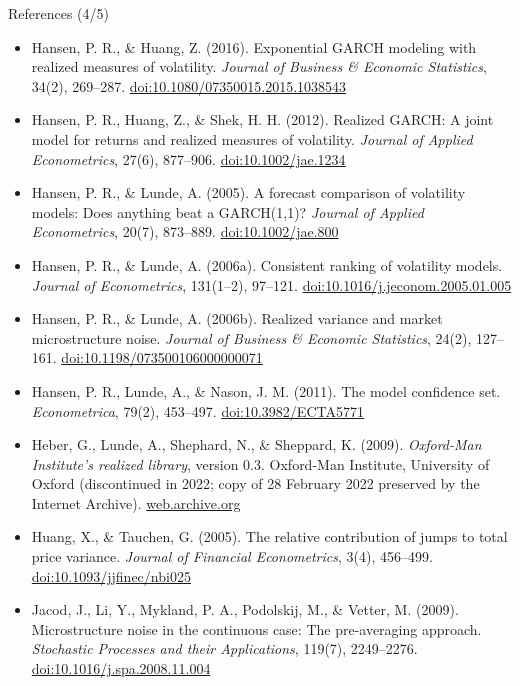 \begin{frame}{References (4/5)}
\itemsize{\tiny}
\begin{itemize}
    \item Hansen, P. R., \& Huang, Z. (2016). Exponential GARCH modeling with realized measures of volatility. \textit{Journal of Business \& Economic Statistics}, 34(2), 269--287. \href{https://doi.org/10.1080/07350015.2015.1038543}{doi:10.1080/07350015.2015.1038543}
    \item Hansen, P. R., Huang, Z., \& Shek, H. H. (2012). Realized GARCH: A joint model for returns and realized measures of volatility. \textit{Journal of Applied Econometrics}, 27(6), 877--906. \href{https://doi.org/10.1002/jae.1234}{doi:10.1002/jae.1234}
    \item Hansen, P. R., \& Lunde, A. (2005). A forecast comparison of volatility models: Does anything beat a GARCH(1,1)? \textit{Journal of Applied Econometrics}, 20(7), 873--889. \href{https://doi.org/10.1002/jae.800}{doi:10.1002/jae.800}
    \item Hansen, P. R., \& Lunde, A. (2006a). Consistent ranking of volatility models. \textit{Journal of Econometrics}, 131(1--2), 97--121. \href{https://doi.org/10.1016/j.jeconom.2005.01.005}{doi:10.1016/j.jeconom.2005.01.005}
    \item Hansen, P. R., \& Lunde, A. (2006b). Realized variance and market microstructure noise. \textit{Journal of Business \& Economic Statistics}, 24(2), 127--161. \href{https://doi.org/10.1198/073500106000000071}{doi:10.1198/073500106000000071}
    \item Hansen, P. R., Lunde, A., \& Nason, J. M. (2011). The model confidence set. \textit{Econometrica}, 79(2), 453--497. \href{https://doi.org/10.3982/ECTA5771}{doi:10.3982/ECTA5771}
    \item Heber, G., Lunde, A., Shephard, N., \& Sheppard, K. (2009). \textit{Oxford-Man Institute's realized library}, version 0.3. Oxford-Man Institute, University of Oxford (discontinued in 2022; copy of 28 February 2022 preserved by the Internet Archive). \href{https://web.archive.org/web/2021/https://realized.oxford-man.ox.ac.uk/terms-and-conditions}{web.archive.org}
    \item Huang, X., \& Tauchen, G. (2005). The relative contribution of jumps to total price variance. \textit{Journal of Financial Econometrics}, 3(4), 456--499. \href{https://doi.org/10.1093/jjfinec/nbi025}{doi:10.1093/jjfinec/nbi025}
    \item Jacod, J., Li, Y., Mykland, P. A., Podolskij, M., \& Vetter, M. (2009). Microstructure noise in the continuous case: The pre-averaging approach. \textit{Stochastic Processes and their Applications}, 119(7), 2249--2276. \href{https://doi.org/10.1016/j.spa.2008.11.004}{doi:10.1016/j.spa.2008.11.004}

\end{itemize}
\end{frame}
